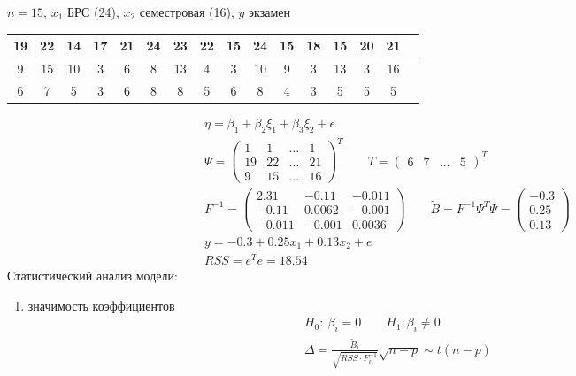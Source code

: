 \documentclass{article}
\begin{document}
\begin{eg}
  $n=15$, $x_1$ БРС (24), $x_2$ семестровая (16), $y$ экзамен
\begin{center}
\begin{tabular}{| c | c | c | c | c | c | c | c | c | c | c | c | c | c | c | c |}
  \hline
   19 & 22 & 14 & 17 & 21 & 24 & 23 & 22 & 15 & 24 & 15 & 18 & 15 & 20 & 21 \\ 
  \hline
   9 & 15 & 10 & 3 & 6 & 8 & 13 & 4 & 3 & 10 & 9 & 3 & 13 & 3 & 16 \\
  \hline
   6 & 7 & 5 & 3 & 6 & 8 & 8 & 5 & 6 & 8 & 4 & 3 & 5 & 5 & 5  \\
  \hline
\end{tabular}
\end{center}
\begin{gather*}
  \eta = \beta_1 + \beta_2 \xi_1 + \beta_3 \xi_2 + \epsilon \\ 
  \Psi = \begin{pmatrix}
    1 & 1 & \dots & 1 \\ 
    19 & 22 & \dots & 21 \\ 
    9 & 15 & \dots & 16
  \end{pmatrix}^{T} \qquad T= \begin{pmatrix}
    6 & 7 & \dots & 5
  \end{pmatrix}^{T} \\ 
  F^{-1} = \begin{pmatrix}
    2.31 & -0.11 & -0.011 \\ 
    -0.11 & 0.0 062 & -0.0 01 \\ 
    -0.011 & -0.0 01 & 0.0 0 36 
  \end{pmatrix} \qquad \tilde{B}=F^{-1}\Psi^{T}\Psi = \begin{pmatrix}
    -0.3 \\ 0.25 \\ 0.13
  \end{pmatrix} \\ 
  y = -0.3 + 0.25 x_1 + 0.13 x_2 + e \\ 
  RSS=e^{T}e =18.54
\end{gather*}
Статистический анализ модели:
\begin{enumerate}
  \item значимость коэффициентов
    \begin{gather*}
      H_0: \: \beta_i =0 \qquad H_1: \beta_i \neq 0 \\ 
      \Delta = \frac{\tilde{B}_i}{\sqrt{RSS \cdot F^{-1}_{ii}}}\sqrt{n-p} \sim t(n-p) \\ 

\end{gather*}
\end{enumerate}
\end{eg}
\end{document}
